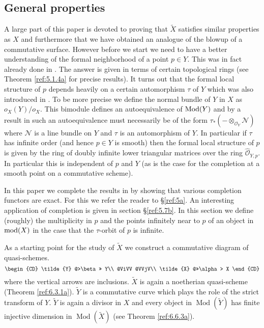 \documentclass{amsproc}
\def\Nscr{{\mathcal N}}
\def\Oscr{{\mathcal O}}
\def\Mod{\mathop{\text{Mod}}}
\def\mod{\mathop{\text{mod}}}
\def\Qch{\operatorname {Mod}}
\let\oldtext\text
\def\text#1{\oldtext{\upshape #1}}
\theoremstyle{definition}
\theoremstyle{remark}
\numberwithin{equation}{section}
\numberwithin{table}{section}
\numberwithin{figure}{section}
\begin{document}
\subsection{General properties}
A large part of this paper is devoted to proving that $\tilde{X}$
satisfies similar properties as $X$ and furthermore that we have
obtained an analogue of the blowup of a commutative surface. However
before we start we need to have a better understanding of the formal
neighborhood of a point $p\in Y$.  This was in fact already done in
\cite{VdBVG}. The answer is given in terms of certain topological
rings (see Theorem \ref{ref:5.1.4a} for precise results).  It turns
out that the formal local structure of $p$ depends heavily on a
certain automorphism $\tau$ of $Y$ which was also introduced in
\cite{VdBVG}. To be more precise we define the normal bundle of $Y$ in
$X$ as $o_X(Y)/o_X$. This bimodule defines an autoequivalence of
$\Mod(Y)$ and by a result in \cite{AZ} such an autoequivalence must
necessarily be of the form $\tau_\ast(-\otimes_{\Oscr_Y}\Nscr)$ where
$\Nscr$ is a line bundle on $Y$ and $\tau$ is an automorphism of $Y$.
In particular if $\tau$ has infinite order (and hence $p\in Y$ is
smooth) then the formal local
structure of $p$ is given by the ring of doubly infinite lower
triangular matrices over the ring $\hat{\Oscr}_{Y,p}$. In particular
this is  independent of $p$ and $Y$ (as is the case for the
completion at a smooth point on a commutative scheme).

 In this
paper we complete the results in \cite{VdBVG} by showing that various
completion functors are exact. For this we refer the reader to
\S\ref{ref:5a}. 
 An interesting application of completion is given in section
\S\ref{ref:5.7b}. In this section we define (roughly) the
multiplicity in $p$ and the points infinitely near to $p$ of an object
in $\mod(X)$ in the case that the $\tau$-orbit of $p$ is infinite.

\smallskip

As a starting point for the study of $\tilde{X}$ we construct a
commutative diagram of quasi-schemes.
\[
\begin{CD}
\tilde{Y} @>\beta>> Y\\
@ViVV @VVjV\\
\tilde{X} @>>\alpha> X
\end{CD}
\]
where the vertical arrows are inclusions. $\tilde{X}$ is again a
noetherian quasi-scheme (Theorem \ref{ref:6.3.1a}).  $\tilde{Y}$
is a commutative curve which plays the role of the strict transform of
$Y$. $\tilde{Y}$ is again a divisor in $X$ and every object in
$\Qch(\tilde{Y})$ has finite injective dimension in $\Qch(\tilde{X})$
(see Theorem \ref{ref:6.6.3a}).
\end{document}
